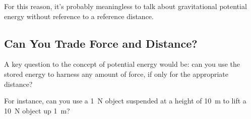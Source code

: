 For this reason, it's probably meaningless to talk about gravitational
potential energy without reference to a reference distance.

\subsection{Can You Trade Force and Distance?}

A key question to the concept of potential energy would be: can you use
the stored energy to harness any amount of force, if only for the
appropriate distance?

For instance, can you use a \SI{1}{N} object suspended at a height of
\SI{10}{m} to lift a \SI{10}{N} object up \SI{1}{m}?
